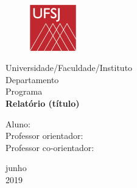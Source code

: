 \documentclass[a4paper,12pt]{article}
\begin{document}

\begin{titlepage}
	\begin{center}
	
	\begin{figure}[!ht]
	\centering
	\includegraphics[width=2cm]{UFSJ_logo.png}
	\end{figure}

		\Huge{Universidade/Faculdade/Instituto}\\
		\large{Departamento}\\ 
		\large{Programa}\\ 
		\vspace{15pt}
        \vspace{95pt}
        \textbf{\LARGE{Relatório (título) }}\\
		\vspace{3,5cm}
	\end{center}
	
	\begin{flushleft}
		\begin{tabbing}
			Aluno: \\
			Professor orientador: \\
			Professor co-orientador: \\
	    \end{tabbing}
    \end{flushleft}
	\vspace{1cm}
	
	\begin{center}
		\vspace{\fill}
            junho\\
            2019
    \end{center}
\end{titlepage}

\end{document}
